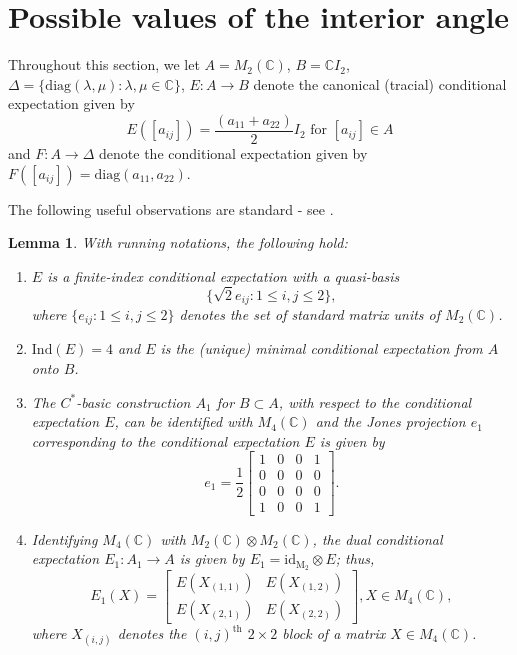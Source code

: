\documentclass[a4]{amsart}
\newtheorem{lemma}[theorem]{\bf Lemma}
\numberwithin{equation}{section}
\newcommand{\ot}{\otimes}
\newcommand{\C}{\mathbb{C}}
\begin{document}
\section{Possible values of the interior angle}\label{possible-values}

Throughout this section, we let $A= M_2(\C)$, $ B=
\C I_2$, $\Delta=\{\mathrm{diag}(\lambda, \mu) : \lambda, \mu \in \C\}$,
$E: A \to B$ denote the  canonical (tracial) conditional expectation  given by
\[
E([a_{ij}]) =
\frac{(a_{11}+a_{22})}{2}I_2 \text{ for } [a_{ij}]\in A
\]
 and
$F: A \to \Delta$ denote the conditional expectation given by $F([a_{ij}])
= \mathrm{diag}(a_{11}, a_{22})$.


The following useful observations are standard - see \cite[Example
  2.4.5]{Wat}.
\begin{lemma}\label{C-M2-basic-construction}
With running notations, the following hold: \begin{enumerate}
\item $E$ is a finite-index conditional expectation with a quasi-basis
\[
\{\sqrt{2}e_{ij} : 1 \leq i,j \leq 2\},
\]
where $\{e_{ij}: 1 \leq i, j \leq 2\}$ denotes the set of standard
matrix units of $M_2(\C)$.
\item \( \mathrm{Ind}(E) =  4 \) and  $E$ is the (unique) minimal conditional expectation from $A$ onto $B$.
\item The $C^*$-basic construction $A_1$ for $B \subset A$, with respect to the
  conditional expectation $E$, can be identified with $M_4(\C)$ and the
  Jones projection $e_1$ corresponding to the conditional expectation
  $E$ is given by
  \[
  e_1 =  \frac{1}{2}
  \begin{bmatrix}
    1 & 0 & 0 & 1\\
    0 & 0 & 0 & 0 \\
    0 & 0 & 0 & 0\\
    1 & 0 & 0 & 1
  	\end{bmatrix}.
  \]
\item Identifying $M_4(\C)$ with $M_2(\C) \ot M_2(\C)$, the dual conditional
  expectation $E_1 : A_1 \to A $ is given by $E_1 = \mathrm{id_{M_2}}
  \ot E$; thus,
  \[
  E_1\left(X\right) = \begin{bmatrix}
	E(X_{(1,1)}) & E(X_{(1,2)}) \\ E(X_{(2,1)}) & E(X_{(2,2)})
  \end{bmatrix}, X \in M_4(\C),
  \]
  where $X_{(i,j)}$ denotes the $(i,j)^{\text{th}}$ $2 \times 2$ block
  of a matrix $X \in M_4(\C)$.
\end{enumerate}
\end{lemma}
\end{document}
